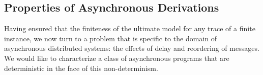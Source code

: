 %
%




\subsection{Properties of Asynchronous Derivations}

Having ensured that the finiteness of the ultimate model for any trace of a
finite \lang instance, we now turn to a problem that is specific to the domain
of asynchronous distributed systems: the effects of delay
and reordering of messages. We would like to characterize a class of
asynchronous \lang programs that are deterministic in the face of this
non-determinism.

%

